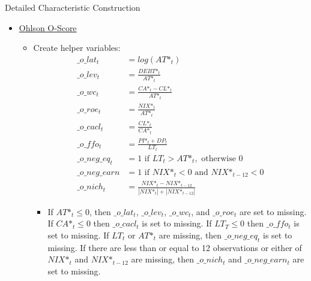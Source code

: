 \documentclass[12pt,title,fleqn]{article}
\begin{document}
\begin{section}{Detailed Characteristic Construction}
\begin{itemize}
\begin{itemize}
                \item Characteristic\footnote{A subscript of $ > 0$, ex: ${VAR_t}_{>0, t}$, is a dummy for if the variable is greater than zero, and it is defined similarly for ${VAR_t}_{<0, t}$ or any other specification. Otherwise, not included as an input, Also, if any variables other than \_f\_eqis$_t$ are missing, then f\_score$_t$ is set to missing.} 
                    \begin{align*}
                        f\_score_t =& \_f\_roa_{>0, t} + \_f\_croa_{>0, t} + \_f\_droa_{>0, t} + \_f\_acc_{>0, t} + \\ &\_f\_lev_{<0, t} + \_f\_liq_{>0, t} + \_f\_eqis_{=0, t} + \_f\_gm_{>0, t} + \_f\_aturn_{>0, t}
                    \end{align*}
            \end{itemize}
        
        \item \hyperlink{ohl2}{\hypertarget{ohl}{Ohlson O-Score}}
            \begin{itemize}
                \item Create helper variables:
                \begin{align*}
                    \_o\_lat_t &= log\left(AT\mbox{*}_t\right) \\
                    \_o\_lev_t &= \frac{DEBT\mbox{*}_t}{AT\mbox{*}_t} \\
                    \_o\_wc_t &= \frac{CA\mbox{*}_t - CL\mbox{*}_t}{AT\mbox{*}_t}  \\
                    \_o\_roe_t &= \frac{NIX\mbox{*}_t}{AT\mbox{*}_t} \\
                    \_o\_cacl_t &= \frac{CL\mbox{*}_t}{CA\mbox{*}_t} \\
                    \_o\_ffo_t &= \frac{PI\mbox{*}_t + DP_t}{LT_t} \\
                    \_o\_neg\_eq_t &= 1 \text{ if } LT_t > AT\mbox{*}_t, \text{ otherwise } 0 \\
                    \_o\_neg\_earn &= 1 \text{ if } NIX\mbox{*}_t < 0 \text{ and } NIX\mbox{*}_{t-12} < 0 \\
                    \_o\_nich_t &= \frac{NIX\mbox{*}_t - NIX\mbox{*}_{t-12}}{|NIX\mbox{*}_t| +  |NIX\mbox{*}_{t-12}|} 
            \end{align*}
            
                \begin{itemize}
                    \item If $AT\mbox{*}_t \leq 0$, then $\_o\_lat_t$, $\_o\_lev_t$, $\_o\_wc_t$, and $\_o\_roe_t$ are set to missing. If $CA\mbox{*}_t \leq 0$ then $\_o\_cacl_t$ is set to missing. If $LT_T \leq 0$ then $\_o\_ffo_t$ is set to missing. If $LT_t$ or $AT\mbox{*}_t$ are missing, then $\_o\_neg\_eq_t$ is set to missing. If there are less than or equal to 12 observations or either of $NIX\mbox{*}_t$ and $NIX\mbox{*}_{t-12}$ are missing, then $\_o\_nich_t$ and $\_o\_neg\_earn_t$ are set to missing.
                \end{itemize}
            

\end{itemize}
\end{itemize}
\end{section}
\end{document}
